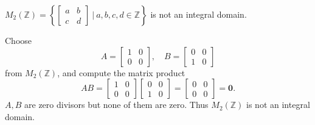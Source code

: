 \begin{example}
    $\displaystyle M_2(\mathbb{Z}) = \left\{ \begin{bmatrix}
    a & b\\ c & d
    \end{bmatrix} \> \bigg \vert \> a,b,c,d \in \mathbb{Z} \right\}$ is not an integral domain.
\end{example}
\begin{solution}
    Choose
    \[
        A = \begin{bmatrix}
            1 & 0\\ 0 & 0
        \end{bmatrix}, \quad 
        B = \begin{bmatrix}
            0 & 0\\ 1 & 0
        \end{bmatrix}
    \]
    from $M_2(\mathbb{Z})$, and compute the matrix product
    \[
        AB = \begin{bmatrix}
            1 & 0\\ 0 & 0
        \end{bmatrix}
        \begin{bmatrix}
            0 & 0\\ 1 & 0
        \end{bmatrix} = \begin{bmatrix}
            0 & 0\\ 0 & 0
        \end{bmatrix} = \mathbf{0}.
    \]
    $A, B$ are zero divisors but none of them are zero. Thus $M_2(\mathbb{Z})$ is not an integral domain. 
\end{solution}

